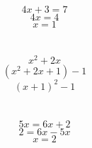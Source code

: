 \documentclass{article}
\begin{document}
\section{}
$$4x + 3 = 7
$$$$4x = 4
$$$$x = 1
$$\section{}
$$x^{2} + 2 x
$$$$( x^{2} + 2x + 1 ) - 1
$$$$( x + 1 )^{2} - 1
$$\section{}
$$5x = 6x + 2
$$$$2 = 6x - 5 x
$$$$x = 2
$$
\end{document}
